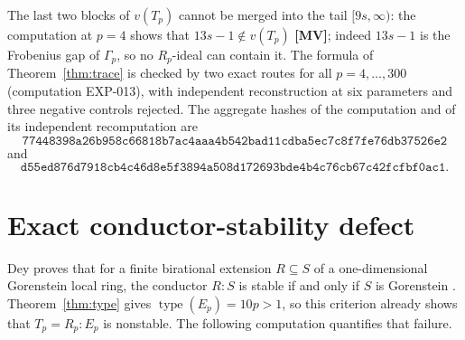 \documentclass[11pt]{article}
\theoremstyle{definition}
\theoremstyle{remark}
\begin{document}
The last two blocks of $v(T_p)$ cannot be merged into the tail $[9s,\infty)$: the computation at
$p=4$ shows that $13s-1\notin v(T_p)$ \textbf{[MV]}; indeed $13s-1$ is the Frobenius gap of
$\Gamma_p$, so no $R_p$-ideal can contain it. The formula of Theorem~\ref{thm:trace} is
checked by two exact routes for all $p=4,\ldots,300$ (computation EXP-013), with independent
reconstruction at six parameters and three negative controls rejected. The aggregate hashes of
the computation and of its independent recomputation are
\[
\texttt{77448398a26b958c66818b7ac4aaa4b542bad11cdba5ec7c8f7fe76db37526e2}
\]
and
\[
\texttt{d55ed876d7918cb4c46d8e5f3894a508d172693bde4b4c76cb67c42fcfbf0ac1}.
\]

\section{\texorpdfstring{\enspace}{}Exact conductor-stability defect}

Dey proves that for a finite birational extension $R\subseteq S$ of a one-dimensional
Gorenstein local ring, the conductor $R:S$ is stable if and only if $S$ is Gorenstein
\cite[Corollary~3.7]{Dey2022}. Theorem~\ref{thm:type} gives
$\operatorname{type}(E_p)=10p>1$, so this criterion already shows that $T_p=R_p:E_p$ is
nonstable. The following computation quantifies that failure.
\end{document}
